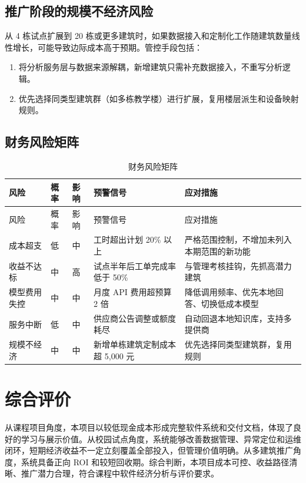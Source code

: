 \documentclass[12pt,a4paper]{ctexart}
\begin{document}
\subsection{推广阶段的规模不经济风险}
从 4 栋试点扩展到 20 栋或更多建筑时，如果数据接入和定制化工作随建筑数量线性增长，可能导致边际成本高于预期。管控手段包括：
\begin{enumerate}
    \item 将分析服务层与数据来源解耦，新增建筑只需补充数据接入，不重写分析逻辑。
    \item 优先选择同类型建筑群（如多栋教学楼）进行扩展，复用楼层派生和设备映射规则。
\end{enumerate}

\subsection{财务风险矩阵}
\begin{longtable}{L{3.0cm}L{1.4cm}L{1.4cm}L{3.5cm}L{4.5cm}}
\caption{财务风险矩阵}\\
\toprule
风险 & 概率 & 影响 & 预警信号 & 应对措施 \\
\midrule
\endfirsthead
\toprule
风险 & 概率 & 影响 & 预警信号 & 应对措施 \\
\midrule
\endhead
成本超支 & 低 & 中 & 工时超出计划 20\% 以上 & 严格范围控制，不增加未列入本期范围的新功能 \\
收益不达标 & 中 & 高 & 试点半年后工单完成率低于 50\% & 与管理考核挂钩，先抓高潜力建筑 \\
模型费用失控 & 中 & 中 & 月度 API 费用超预算 2 倍 & 降低调用频率、优先本地回答、切换低成本模型 \\
服务中断 & 低 & 中 & 供应商公告调整或额度耗尽 & 自动回退本地知识库，支持多提供商 \\
规模不经济 & 中 & 中 & 新增单栋建筑定制成本超 5,000 元 & 优先选择同类型建筑群，复用规则 \\
\bottomrule
\end{longtable}

\section{综合评价}
从课程项目角度，本项目以较低现金成本形成完整软件系统和交付文档，体现了良好的学习与展示价值。从校园试点角度，系统能够改善数据管理、异常定位和运维闭环，短期经济收益不一定立刻覆盖全部投入，但管理价值明确。从多建筑推广角度，系统具备正向 ROI 和较短回收期。综合判断，本项目成本可控、收益路径清晰、推广潜力合理，符合课程中软件经济分析与评价要求。
\end{document}
